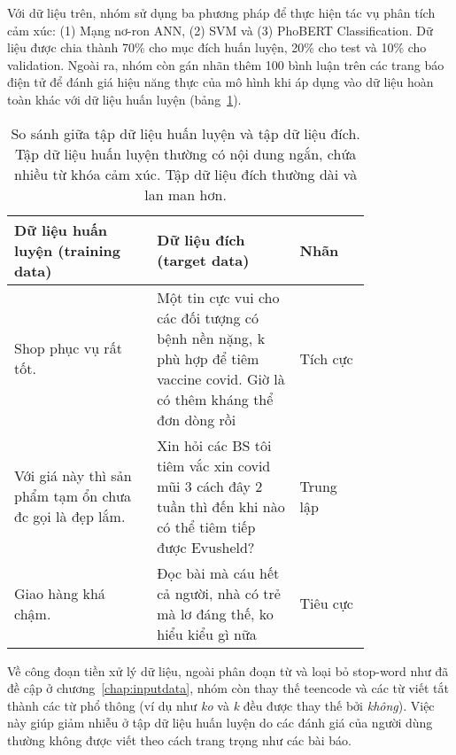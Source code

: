Với dữ liệu trên, nhóm sử dụng ba phương pháp để thực hiện tác vụ phân tích cảm xúc: (1) Mạng nơ-ron ANN, (2) \acrfull{SVM} và (3) PhoBERT Classification. Dữ liệu được chia thành 70\% cho mục đích huấn luyện, 20\% cho test và 10\% cho validation. Ngoài ra, nhóm còn gán nhãn thêm 100 bình luận trên các trang báo điện tử để đánh giá hiệu năng thực của mô hình khi áp dụng vào dữ liệu hoàn toàn khác với dữ liệu huấn luyện (bảng~\ref{table:train-target-comparison}).

\begin{table}[ht!]
    \centering
    \small
    \begin{tabular}{|p{0.4\linewidth}|p{0.4\linewidth}|l|}
    \hline
    \textbf{Dữ liệu huấn luyện (training data)}                                                  & \textbf{Dữ liệu đích (target data)}                                                                                        & \textbf{Nhãn} \\ \hline
    Shop phục vụ rất tốt.                                                                        & Một tin cực vui cho các đối tượng có bệnh nền nặng, k phù hợp để tiêm vaccine covid. Giờ là có thêm kháng thể đơn dòng rồi & Tích cực      \\ \hline
    Với giá này thì sản phẩm tạm ổn chưa đc gọi là đẹp lắm. & Xin hỏi các BS tôi tiêm vắc xin covid mũi 3 cách đây 2 tuần thì đến khi nào có thể tiêm tiếp được Evusheld?                & Trung lập     \\ \hline
    Giao hàng khá chậm.                                                                          & Đọc bài mà cáu hết cả người, nhà có trẻ mà lơ đáng thế, ko hiểu kiểu gì nữa                                                & Tiêu cực      \\ \hline
    \end{tabular}
    \caption{So sánh giữa tập dữ liệu huấn luyện và tập dữ liệu đích. Tập dữ liệu huấn luyện thường có nội dung ngắn, chứa nhiều từ khóa cảm xúc. Tập dữ liệu đích thường dài và lan man hơn.}
    \label{table:train-target-comparison}
\end{table}

Về công đoạn tiền xử lý dữ liệu, ngoài phân đoạn từ và loại bỏ stop-word như đã đề cập ở chương~\ref{chap:inputdata}, nhóm còn thay thế teencode và các từ viết tắt thành các từ phổ thông (ví dụ như \textit{ko} và \textit{k} đều được thay thế bởi \textit{không}). Việc này giúp giảm nhiễu ở tập dữ liệu huấn luyện do các đánh giá của người dùng thường không được viết theo cách trang trọng như các bài báo.

